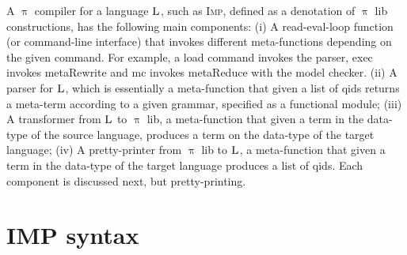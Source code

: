 \documentclass[a4paper,openany]{book}
\begin{document}
A $\uppi$ compiler for a language $\textsc{L}$, such as \textsc{Imp}, defined as a denotation of $\uppi$ lib constructions, has the following main components:
(i) A read-eval-loop function (or command-line interface) that invokes different meta-functions depending on the given command. For example, a load command invokes the parser, exec invokes metaRewrite and mc invokes metaReduce with the model checker.
(ii) A parser for $\textsc{L}$, which is essentially a meta-function that given a list of qids returns a meta-term according to a given grammar, specified as a functional module;
(iii) A transformer from $\textsc{L}$ to $\uppi$ lib, a meta-function that given a term in the data-type of the source language, produces a term on the data-type of the target language;
(iv) A pretty-printer from $\uppi$ lib to $\textsc{L}$, a meta-function that given a term in the data-type of the target language produces a list of qids. Each component is discussed next, but pretty-printing.







\section{IMP syntax}\label{sec:imp-grammar}
\end{document}
